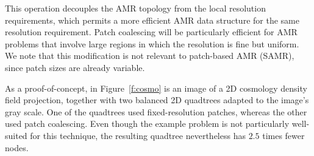 \documentclass[11pt,letterpaper]{article}
\begin{document}



This operation decouples the AMR topology from the local resolution
requirements, which permits a more efficient AMR data structure for
the same resolution requirement.  Patch coalescing will be
particularly efficient for AMR problems that involve large regions in
which the resolution is fine but uniform.  We note that this
modification is not relevant to patch-based AMR (SAMR), since patch
sizes are already variable.

As a proof-of-concept, in Figure~\ref{f:cosmo} is an image of a 2D
cosmology density field projection, together with two balanced 2D
quadtrees adapted to the image's gray scale.  One of the quadtrees
used fixed-resolution patches, whereas the other used patch
coalescing.  Even though the example problem is not particularly
well-suited for this technique, the resulting quadtree nevertheless
has $2.5$ times fewer nodes.

\end{document}
